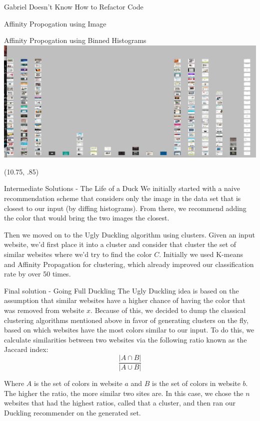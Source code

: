 \documentclass{beamer}
\begin{document}
\begin{frame}{\centerline{\Huge Gabriel Doesn't Know How to Refactor Code}}
\begin{textblock}{5}
\begin{block}{Affinity Propogation using Image}
\end{block}
\begin{block}{Affinity Propogation using Binned Histograms}
\includegraphics[scale=.5]{binAffProp.jpg}
\end{block}
\end{textblock}

\begin{textblock}{5}(10.75, .85)
\begin{block}{Intermediate Solutions - The Life of a Duck}
We initially started with a naive recommendation scheme that considers only the image in the data set that is closest to our input (by diffing
histograms). From there, we recommend adding the color that would bring the two images the
closest.

Then we moved on to the Ugly Duckling algorithm using clusters. Given an input website, we'd first place it into a
cluster and consider that cluster the set of similar websites where we'd try to find the color $C$. Initially we used K-means and
Affinity Propagation for clustering, which already improved our classification rate by over 50 times.
\end{block}

\begin{block}{Final solution - Going Full Duckling}
The Ugly Duckling idea is based on the assumption that similar websites have a higher chance of having the color that
was removed from website $x$. Because of this, we decided to dump the classical clustering algorithms mentioned above in favor of
generating clusters on the fly, based on which websites have the most colors similar to our input. To do this, we
calculate similarities between two websites via the following ratio known as the Jaccard index:
$$\frac{|A \cap B|}{|A \cup B|}$$

Where $A$ is the set of colors in website $a$ and $B$ is the set of colors in website $b$. The higher the ratio, the
more similar two sites are. In this case, we chose the $n$ websites that had the highest ratios, called that a cluster,
and then ran our Duckling recommender on the generated set.


\end{block}
\end{textblock}
\end{frame}
\end{document}

